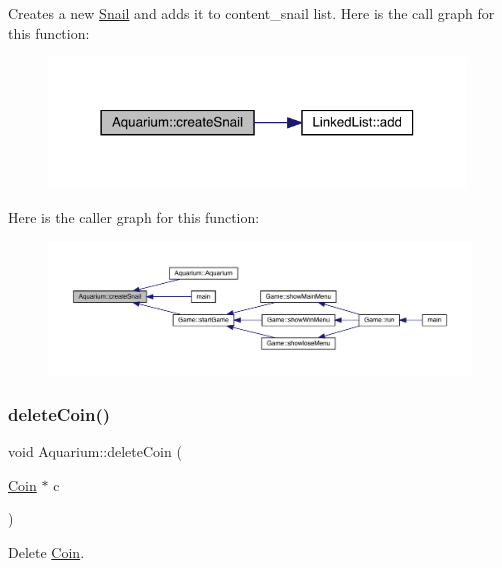 Creates a new \mbox{\hyperlink{class_snail}{Snail}} and adds it to content\+\_\+snail list. Here is the call graph for this function\+:\nopagebreak
\begin{figure}[H]
\begin{center}
\leavevmode
\includegraphics[width=314pt]{class_aquarium_ae631c3fd8587b1889ffea4e0ade6359e_cgraph}
\end{center}
\end{figure}
Here is the caller graph for this function\+:
\nopagebreak
\begin{figure}[H]
\begin{center}
\leavevmode
\includegraphics[width=350pt]{class_aquarium_ae631c3fd8587b1889ffea4e0ade6359e_icgraph}
\end{center}
\end{figure}
\mbox{\label{class_aquarium_a187e59dd6efd62b577e97b8e00237c77}} 
\subsubsection{\texorpdfstring{delete\+Coin()}{deleteCoin()}}
{\footnotesize\ttfamily void Aquarium\+::delete\+Coin (\begin{DoxyParamCaption}\item[{\mbox{\hyperlink{class_coin}{Coin}} $\ast$}]{c }\end{DoxyParamCaption})}



Delete \mbox{\hyperlink{class_coin}{Coin}}. 

